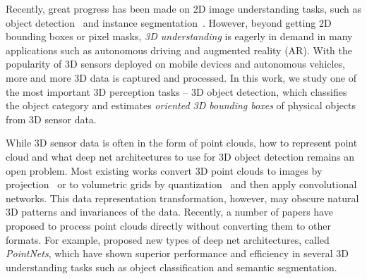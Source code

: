 \label{sec:intro}



Recently, great progress has been made on 2D image understanding tasks, such as object detection~\cite{girshick2014rich} and instance segmentation~\cite{he2017mask}. However, beyond getting 2D bounding boxes or pixel masks, \emph{3D understanding} is eagerly in demand in many applications such as autonomous driving and augmented reality (AR). With the popularity of 3D sensors deployed on mobile devices and autonomous vehicles, more and more 3D data is captured and processed. In this work, we study one of the most important 3D perception tasks -- 3D object detection, which classifies the object category and estimates \emph{oriented 3D bounding boxes} of physical objects from 3D sensor data. 


While 3D sensor data is often in the form of point clouds, how to represent point cloud and what deep net architectures to use for 3D object detection remains an open problem. Most existing works convert 3D point clouds to images by projection~\cite{su15mvcnn,qi2016volumetric} or to volumetric grids by quantization~\cite{wu20153d,maturana2015voxnet,qi2016volumetric} and then apply convolutional networks. This data representation transformation, however, may obscure natural 3D patterns and invariances of the data. %
Recently, a number of papers have proposed to process point clouds directly without converting them to other formats. For example, \cite{qi2017pointnet, qi2017pointnetplusplus} proposed new types of deep net architectures, called \emph{PointNets}, which have shown superior performance and efficiency in several 3D understanding tasks such as object classification and semantic segmentation.

